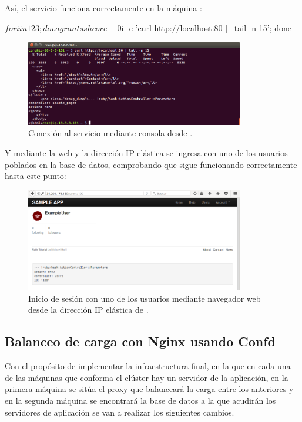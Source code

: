 Así, el servicio funciona correctamente en la máquina :
\begin{code}
$ for i in 1 2 3; do vagrant ssh core-0$i -c 'curl http://localhost:80 | \
  tail -n 15'; done
\end{code}

\begin{figure}[H]
\centering
\includegraphics[width=0.85\textwidth]{images/figures/skydns-curl.png}
\caption{Conexión al servicio mediante consola desde \kode{core-01}.}
\end{figure}

Y mediante la web y la dirección IP elástica se ingresa con uno de los usuarios poblados en la base de datos, comprobando que sigue funcionando correctamente hasta este punto:

\begin{figure}[H]
\centering
\includegraphics[width=0.85\textwidth]{images/figures/skydns-web.png}
\caption{Inicio de sesión con uno de los usuarios mediante navegador web desde la dirección IP elástica de .}
\end{figure}

\subsection{Balanceo de carga con Nginx usando Confd}

Con el propósito de implementar la infraestructura final, en la que en cada una de las máquinas que conforma el clúster hay un servidor de la aplicación, en la primera máquina se sitúa el proxy que balanceará la carga entre los anteriores y en la segunda máquina se encontrará la base de datos a la que acudirán los servidores de aplicación se van a realizar los siguientes cambios. 

